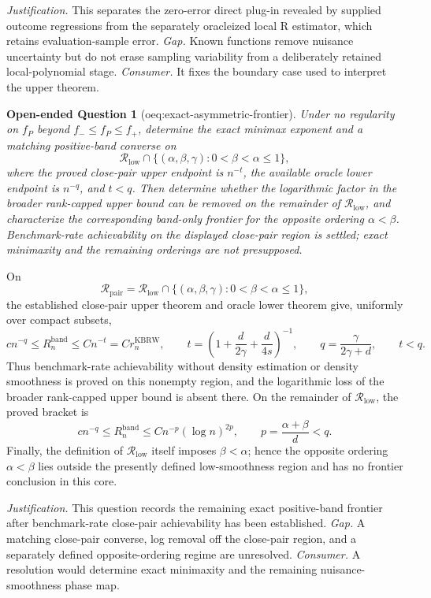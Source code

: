 \documentclass{article}
\newtheorem{openendedquestion}{Open-ended Question}
\begin{document}
\par\smallskip\noindent \textit{Justification.} This separates the zero-error direct plug-in revealed by supplied outcome regressions from the separately oracleized local R estimator, which retains evaluation-sample error. \textit{Gap.} Known functions remove nuisance uncertainty but do not erase sampling variability from a deliberately retained local-polynomial stage. \textit{Consumer.} It fixes the boundary case used to interpret the upper theorem.

\begin{openendedquestion}[oeq:exact-asymmetric-frontier]\label{oeq:exact-asymmetric-frontier}
Under no regularity on \(f_P\) beyond \(f_{-}\leq f_P\leq f_{+}\), determine the exact minimax exponent and a matching positive-band converse on
\[
\mathcal R_{\mathrm{low}}\cap
\{(\alpha,\beta,\gamma):0<\beta<\alpha\leq1\},
\]
where the proved close-pair upper endpoint is \(n^{-t}\), the available oracle lower endpoint is \(n^{-q}\), and \(t<q\).  Then determine whether the logarithmic factor in the broader rank-capped upper bound can be removed on the remainder of \(\mathcal R_{\mathrm{low}}\), and characterize the corresponding band-only frontier for the opposite ordering \(\alpha<\beta\).  Benchmark-rate achievability on the displayed close-pair region is settled; exact minimaxity and the remaining orderings are not presupposed.
\end{openendedquestion}
On
\[
\mathcal R_{\mathrm{pair}}
=\mathcal R_{\mathrm{low}}\cap
\{(\alpha,\beta,\gamma):0<\beta<\alpha\leq1\},
\]
the established close-pair upper theorem and oracle lower theorem give,
uniformly over compact subsets,
\[
c n^{-q}\leq R_n^{\mathrm{band}}
\leq C n^{-t}=C r_n^{\mathrm{KBRW}},
\qquad
t=\left(1+\frac d{2\gamma}+\frac d{4s}\right)^{-1},
\qquad
q=\frac{\gamma}{2\gamma+d},
\qquad t<q.
\]
Thus benchmark-rate achievability without density estimation or density
smoothness is proved on this nonempty region, and the logarithmic loss of the
broader rank-capped upper bound is absent there.  On the remainder of
\(\mathcal R_{\mathrm{low}}\), the proved bracket is
\[
c n^{-q}\leq R_n^{\mathrm{band}}
\leq Cn^{-p}(\log n)^{2p},
\qquad
p=\frac{\alpha+\beta}{d}<q.
\]
Finally, the definition of \(\mathcal R_{\mathrm{low}}\) itself imposes
\(\beta<\alpha\); hence the opposite ordering \(\alpha<\beta\) lies outside
the presently defined low-smoothness region and has no frontier conclusion in
this core.
\par\smallskip\noindent \textit{Justification.} This question records the remaining exact positive-band frontier after benchmark-rate close-pair achievability has been established. \textit{Gap.} A matching close-pair converse, log removal off the close-pair region, and a separately defined opposite-ordering regime are unresolved. \textit{Consumer.} A resolution would determine exact minimaxity and the remaining nuisance-smoothness phase map.
\end{document}
